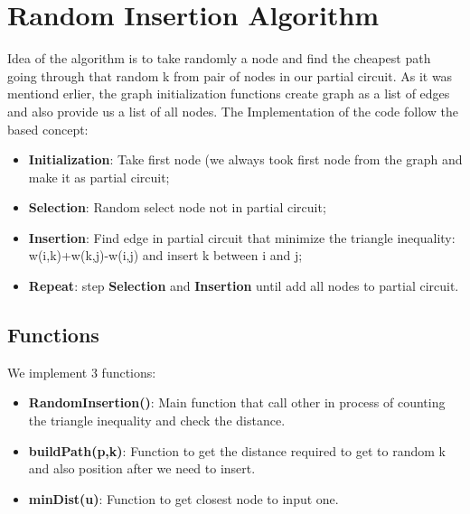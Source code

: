 \section{Random Insertion Algorithm}\label{randominsertion}
Idea of the algorithm is to take randomly a node and find the cheapest path going through that random k from pair of nodes in our partial circuit. 
As it was mentiond erlier, the graph initialization functions create graph as a list of edges and also provide us a list of all nodes.
The Implementation of the code follow the based concept:

\begin{itemize}
    \item \textbf{Initialization}: Take first node (we always took first node from the graph and make it as partial circuit;
    \item \textbf{Selection}: Random select node not in partial circuit;
    \item \textbf{Insertion}: Find edge in partial circuit that minimize the triangle inequality: w(i,k)+w(k,j)-w(i,j) and insert k between i and j;
    \item \textbf{Repeat}: step \textbf{Selection} and \textbf{Insertion} until add all nodes to partial circuit.
\end{itemize}


\subsection{Functions}
We implement 3 functions: 

\begin{itemize}
	\item \textbf{RandomInsertion()}: Main function that call other in process of counting the triangle inequality and check the distance.
	\item \textbf{buildPath(p,k)}: Function to get the distance required to get to random k and also position after we need to insert. 
	\item \textbf{minDist(u)}: Function to get closest node to input one.
\end{itemize}

